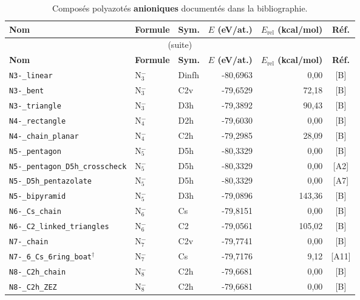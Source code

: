 \begin{longtable}{@{}p{4.4cm}lp{1.5cm}rrc@{}}
\caption{Compos\'es polyazot\'es \textbf{anioniques} document\'es dans la bibliographie.}
\label{tab:final-anion}\\
\toprule
\textbf{Nom} & \textbf{Formule} & \textbf{Sym.} & \textbf{$E$ (eV/at.)} & \textbf{$E_{\mathrm{rel}}$ (kcal/mol)} & \textbf{R\'ef.} \\
\midrule
\endfirsthead
\multicolumn{6}{c}{\small (suite)}\\
\toprule
\textbf{Nom} & \textbf{Formule} & \textbf{Sym.} & \textbf{$E$ (eV/at.)} & \textbf{$E_{\mathrm{rel}}$ (kcal/mol)} & \textbf{R\'ef.} \\
\midrule
\endhead
\bottomrule
\endfoot
\bottomrule
\endlastfoot
\addlinespace
\texttt{N3-\_linear} & N$_{3}^{-}$ & Dinfh & -80{,}6963 & 0{,}00 & [B] \\
\texttt{N3-\_bent} & N$_{3}^{-}$ & C2v & -79{,}6529 & 72{,}18 & [B] \\
\texttt{N3-\_triangle} & N$_{3}^{-}$ & D3h & -79{,}3892 & 90{,}43 & [B] \\
\addlinespace
\texttt{N4-\_rectangle} & N$_{4}^{-}$ & D2h & -79{,}6030 & 0{,}00 & [B] \\
\texttt{N4-\_chain\_planar} & N$_{4}^{-}$ & C2h & -79{,}2985 & 28{,}09 & [B] \\
\addlinespace
\texttt{N5-\_pentagon} & N$_{5}^{-}$ & D5h & -80{,}3329 & 0{,}00 & [B] \\
\texttt{N5-\_pentagon\_D5h\_crosscheck} & N$_{5}^{-}$ & D5h & -80{,}3329 & 0{,}00 & [A2] \\
\texttt{N5-\_D5h\_pentazolate} & N$_{5}^{-}$ & D5h & -80{,}3329 & 0{,}00 & [A7] \\
\texttt{N5-\_bipyramid} & N$_{5}^{-}$ & D3h & -79{,}0896 & 143{,}36 & [B] \\
\addlinespace
\texttt{N6-\_Cs\_chain} & N$_{6}^{-}$ & Cs & -79{,}8151 & 0{,}00 & [B] \\
\texttt{N6-\_C2\_linked\_triangles} & N$_{6}^{-}$ & C2 & -79{,}0561 & 105{,}02 & [B] \\
\addlinespace
\texttt{N7-\_chain} & N$_{7}^{-}$ & C2v & -79{,}7741 & 0{,}00 & [B] \\
\texttt{N7-\_6\_Cs\_6ring\_boat}$^{\dagger}$ & N$_{7}^{-}$ & Cs & -79{,}7176 & 9{,}12 & [A11] \\
\addlinespace
\texttt{N8-\_C2h\_chain} & N$_{8}^{-}$ & C2h & -79{,}6681 & 0{,}00 & [B] \\
\texttt{N8-\_C2h\_ZEZ} & N$_{8}^{-}$ & C2h & -79{,}6681 & 0{,}00 & [B] \\

\end{longtable}

